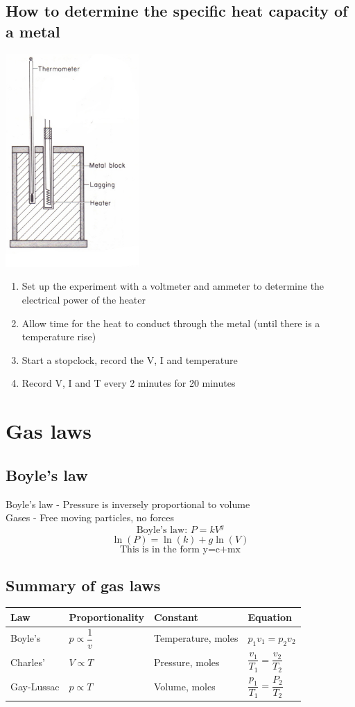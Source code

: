 \documentclass{article}[18pt]
\begin{document}
\subsection{How to determine the specific heat capacity of a metal}
\includegraphics[width=2in]{SHC_Experiment.jpg}
\begin{enumerate}
\item Set up the experiment with a voltmeter and ammeter to determine the electrical power of the heater
\item Allow time for the heat to conduct through the metal (until there is a temperature rise)
\item Start a stopclock, record the V, I and temperature
\item Record V, I and T every 2 minutes for 20 minutes
\end{enumerate}
\section{Gas laws}
\subsection{Boyle's law}
Boyle's law - Pressure is inversely proportional to volume\\
Gases - Free moving particles, no forces\\
$$\text{Boyle's law: } P=kV^{g}$$
$$\ln(P)=\ln(k)+g\ln(V)$$
$$\text{This is in the form y=c+mx}$$
\subsection{Summary of gas laws}
\begin{tabularx}{\textwidth}{|X|X|X|X|}
\hline
Law&Proportionality&Constant&Equation\\
\hline
Boyle's&$p\propto\dfrac{1}{v}$&Temperature, moles&$p_1v_1=p_2v_2$\\
\hline
Charles'&$V\propto T$&Pressure, moles&$\dfrac{v_1}{T_1}=\dfrac{v_2}{T_2}$\\
\hline
Gay-Lussac&$p\propto T$&Volume, moles&$\dfrac{p_1}{T_1}=\dfrac{P_2}{T_2}$\\
\hline
\end{tabularx}
\newpage
\end{document}

